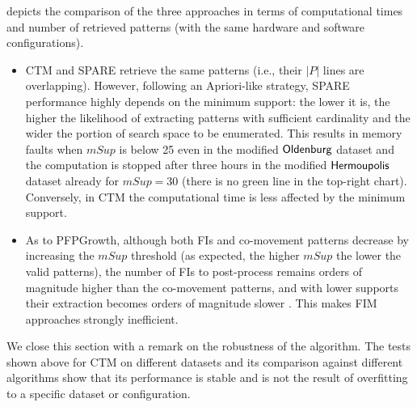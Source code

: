 \documentclass[preprint,12pt,authoryear]{elsarticle} %
\renewcommand{\sf}[1]{\textsf{\textup{#1}}}
\newcommand{\mf}[1]{#1}
\begin{document}
\mf{
 depicts the comparison of the three approaches in terms of computational times and number of retrieved patterns (with the same hardware and software configurations).

\begin{itemize}
    \item CTM and SPARE retrieve the same patterns (i.e., their $|P|$ lines are overlapping).
    However, following an Apriori-like strategy, SPARE performance highly depends on the minimum support: the lower it is, the higher the likelihood of extracting patterns with sufficient cardinality and the wider the portion of search space to be enumerated.
    This results in memory faults when $mSup$ is below 25 even in the modified $\sf{Oldenburg}$ dataset and the computation is stopped after three hours in the modified $\sf{Hermoupolis}$ dataset already for $mSup=30$ (there is no green line in the top-right chart). 
    Conversely, in CTM the computational time is less affected by the minimum support. %
    \item As to PFPGrowth, although both FIs and co-movement patterns decrease by increasing the $mSup$ threshold (as expected, the higher $mSup$ the lower the valid patterns), the number of FIs to post-process remains orders of magnitude higher than the co-movement patterns, and with lower supports their extraction becomes orders of magnitude slower \citep{DBLP:journals/tkde/LuccheseOP06}.
    This makes FIM approaches strongly inefficient.
\end{itemize}
We close this section with a remark on the robustness of the algorithm. The tests shown above for CTM on different datasets and its comparison against different algorithms show that its performance is stable and is not the result of overfitting to a specific dataset or configuration.
}
\end{document}
